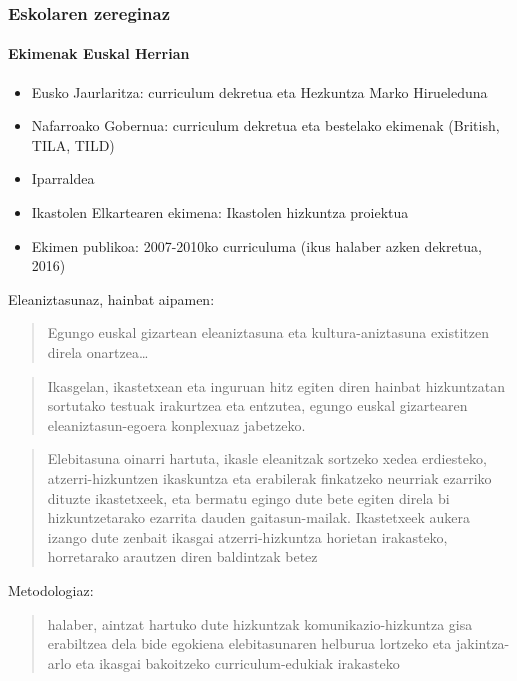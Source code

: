 \documentclass[
]{book}
\providecommand{\tightlist}{%
  \setlength{\itemsep}{0pt}\setlength{\parskip}{0pt}}
\begin{document}
\hypertarget{eskolaren-zereginaz}{%
\subsubsection{Eskolaren zereginaz}\label{eskolaren-zereginaz}}

\hypertarget{ekimenak-euskal-herrian}{%
\paragraph{Ekimenak Euskal Herrian}\label{ekimenak-euskal-herrian}}

\begin{itemize}
\tightlist
\item
  Eusko Jaurlaritza: curriculum dekretua eta Hezkuntza Marko Hirueleduna
\item
  Nafarroako Gobernua: curriculum dekretua eta bestelako ekimenak (British, TILA, TILD)
\item
  Iparraldea
\item
  Ikastolen Elkartearen ekimena: Ikastolen hizkuntza proiektua
\item
  Ekimen publikoa: 2007-2010ko curriculuma (ikus halaber azken dekretua, 2016)
\end{itemize}

Eleaniztasunaz, hainbat aipamen:

\begin{quote}
Egungo euskal gizartean eleaniztasuna eta kultura-aniztasuna existitzen direla onartzea\ldots{}
\end{quote}

\begin{quote}
Ikasgelan, ikastetxean eta inguruan hitz egiten diren hainbat hizkuntzatan sortutako testuak irakurtzea eta entzutea, egungo euskal gizartearen eleaniztasun-egoera konplexuaz jabetzeko.
\end{quote}

\begin{quote}
Elebitasuna oinarri hartuta, ikasle eleanitzak sortzeko xedea erdiesteko, atzerri-hizkuntzen ikaskuntza eta erabilerak finkatzeko neurriak ezarriko dituzte ikastetxeek, eta bermatu egingo dute bete egiten direla bi hizkuntzetarako ezarrita dauden gaitasun-mailak. Ikastetxeek aukera izango dute zenbait ikasgai atzerri-hizkuntza horietan irakasteko, horretarako arautzen diren baldintzak betez
\end{quote}

Metodologiaz:

\begin{quote}
halaber, aintzat hartuko dute hizkuntzak komunikazio-hizkuntza gisa erabiltzea dela bide egokiena elebitasunaren helburua lortzeko eta jakintza-arlo eta ikasgai bakoitzeko curriculum-edukiak irakasteko
\end{quote}
\end{document}
